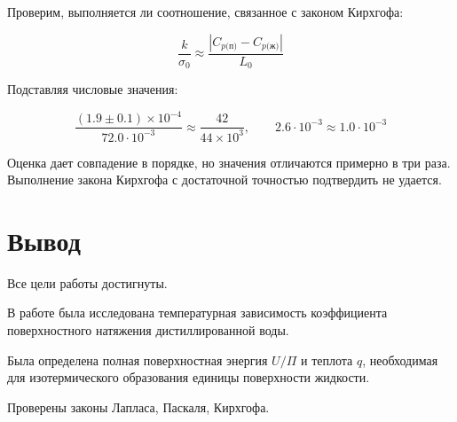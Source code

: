 \documentclass[a4paper,12pt]{article} %
\begin{document}
Проверим, выполняется ли соотношение, связанное с законом Кирхгофа:

\[
  \frac{k}{\sigma_0} \approx \frac{|C_{p \text{(п)}} - C_{p \text{(ж)}}|}{L_0}
\]

Подставляя числовые значения:

\[
  \frac{(1.9 \pm 0.1) \times 10^{-4}}{72.0 \cdot 10^{-3}} \approx \frac{42}{44 \times 10^3}, \qquad 2.6 \cdot 10^{-3} \approx 1.0 \cdot 10^{-3}
\]

Оценка дает совпадение в порядке, но значения отличаются примерно в три раза. Выполнение закона Кирхгофа с достаточной точностью подтвердить не удается.

\section*{Вывод}

Все цели работы достигнуты. 

В работе была исследована температурная зависимость коэффициента поверхностного натяжения дистиллированной воды.

Была определена полная поверхностная энергия $U/\Pi$ и теплота $q$, необходимая для изотермического образования единицы поверхности жидкости. 

Проверены законы Лапласа, Паскаля, Кирхгофа.
\end{document}

